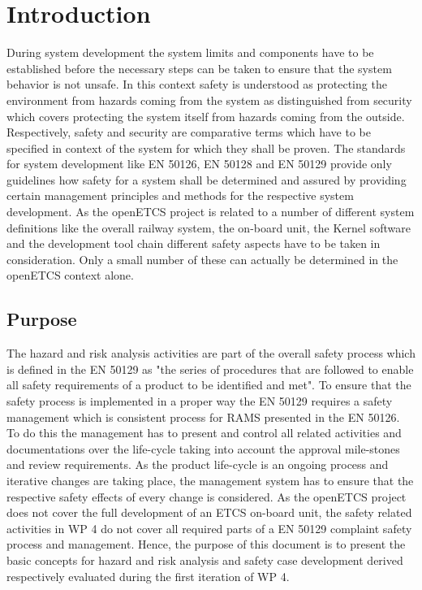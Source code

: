 \documentclass{template/openetcs_report}
\begin{document}

\mainmatter

\chapter{Introduction}
\label{sec:introduction}

During system development the system limits and components have to be established before the necessary steps can be taken to ensure that the system behavior is not unsafe. In this context safety is understood as protecting the environment from hazards coming from the system as distinguished from security which covers protecting the system itself from hazards coming from the outside. Respectively, safety and security are comparative terms which have to be specified in context of the system for which they shall be proven. The standards for system development like EN 50126, EN 50128 and EN 50129 provide only guidelines how safety for a system shall be determined and assured by providing certain management principles and methods for the respective system development. As the openETCS project is related to a number of different system definitions like the overall railway system, the on-board unit, the Kernel software and the development tool chain different safety aspects have to be taken in consideration. Only a small number of these can actually be determined in the openETCS context alone.

\section{Purpose}
\label{sec:purpose}

The hazard and risk analysis activities are part of the overall safety process which is defined in the EN 50129 as "the series of procedures that are followed to enable all safety requirements of a product to be identified and met". To ensure that the safety process is implemented in a proper way the EN 50129 requires a safety management which is consistent process for RAMS presented in the EN 50126. To do this the management has to present and control all related activities and documentations over the life-cycle taking into account the approval mile-stones and review requirements. As the product life-cycle is an ongoing process and iterative changes are taking place, the management system has to ensure that the respective safety effects of every change is considered. As the openETCS project does not cover the full development of an ETCS on-board unit, the safety related activities in WP 4 do not cover all required parts of a EN 50129 complaint safety process and management. Hence, the purpose of this document is to present the basic concepts for hazard and risk analysis and safety case development derived respectively evaluated during the first iteration of WP 4. 
\end{document}

